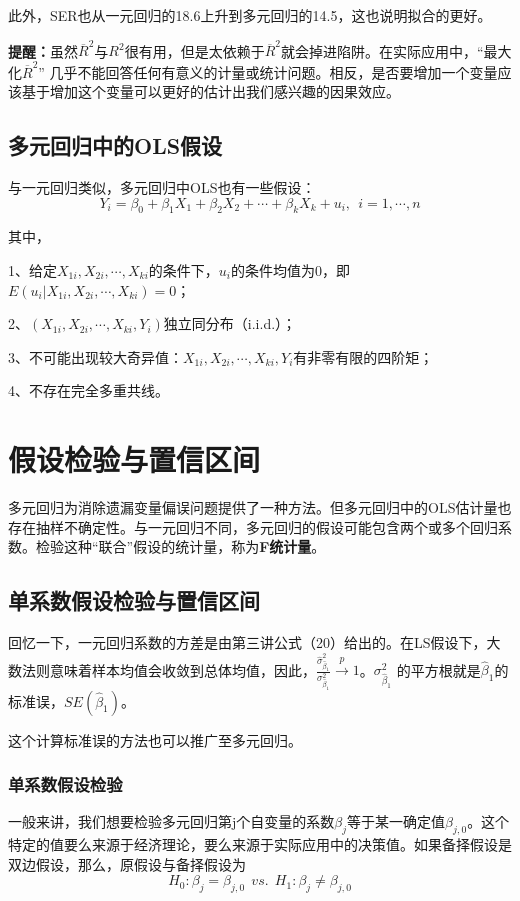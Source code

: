 \documentclass[cn,12pt,math=newtx,citestyle=gb7714-2015,bibstyle=gb7714-2015]{elegantbook}
\begin{document}
	此外，SER也从一元回归的18.6上升到多元回归的14.5，这也说明拟合的更好。
	
	\textbf{提醒：}虽然$\overline{R}^2$与$R^2$很有用，但是太依赖于$\overline{R}^2$就会掉进陷阱。在实际应用中，“最大化$\overline{R}^2$” 几乎不能回答任何有意义的计量或统计问题。相反，是否要增加一个变量应该基于增加这个变量可以更好的估计出我们感兴趣的因果效应。
	
	\subsection{多元回归中的OLS假设}
	与一元回归类似，多元回归中OLS也有一些假设：
	\begin{equation}
		Y_i=\beta_0+\beta_1X_1+\beta_2X_2+\cdots+\beta_kX_k+u_i,~~i=1,\cdots,n
	\end{equation}
	
	其中，
	
	1、给定$X_{1i},X_{2i},\cdots,X_{ki}$的条件下，$u_i$的条件均值为0，即$E(u_i|X_{1i},X_{2i},\cdots,X_{ki})=0$；
	
	2、$(X_{1i},X_{2i},\cdots,X_{ki},Y_i)$独立同分布（i.i.d.）；
	
	3、不可能出现较大奇异值：$X_{1i},X_{2i},\cdots,X_{ki},Y_i$有非零有限的四阶矩；
	
	4、不存在完全多重共线。
	
	\section{假设检验与置信区间}
	多元回归为消除遗漏变量偏误问题提供了一种方法。但多元回归中的OLS估计量也存在抽样不确定性。与一元回归不同，多元回归的假设可能包含两个或多个回归系数。检验这种“联合”假设的统计量，称为\textbf{F统计量}。
	
	\subsection{单系数假设检验与置信区间}
	回忆一下，一元回归系数的方差是由第三讲公式（20）给出的。在LS假设下，大数法则意味着样本均值会收敛到总体均值，因此，$\frac{\hat{\sigma}_{\hat{\beta}_1}^2}{\sigma_{\hat{\beta}_1}^2}\xrightarrow{p}1$。$\sigma_{\hat{\beta}_1}^2$ 的平方根就是$\hat{\beta}_1$的标准误，$SE(\hat{\beta}_1)$。
	
	这个计算标准误的方法也可以推广至多元回归。
	
	\subsubsection{单系数假设检验}
	一般来讲，我们想要检验多元回归第j个自变量的系数$\beta_j$等于某一确定值$\beta_{j,0}$。这个特定的值要么来源于经济理论，要么来源于实际应用中的决策值。如果备择假设是双边假设，那么，原假设与备择假设为
	\begin{equation}
		H_0:\beta_j=\beta_{j,0}~~vs.~~H_1:\beta_j\neq\beta_{j,0}
	\end{equation}
	
\end{document}
